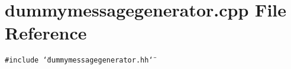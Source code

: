 \section{dummymessagegenerator.cpp File Reference}
\label{dummymessagegenerator_8cpp}


{\tt \#include \char`\"{}dummymessagegenerator.hh\char`\"{}}\par
